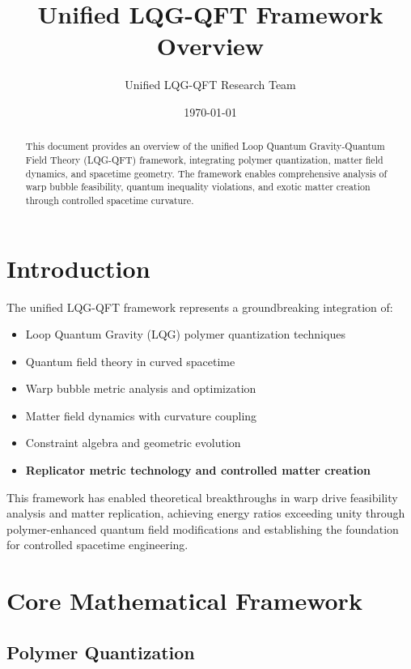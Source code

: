 \documentclass[11pt]{article}
\title{Unified LQG-QFT Framework Overview}
\author{Unified LQG-QFT Research Team}
\date{\today}
\begin{document}
\maketitle

\begin{abstract}
This document provides an overview of the unified Loop Quantum Gravity-Quantum Field Theory (LQG-QFT) framework, integrating polymer quantization, matter field dynamics, and spacetime geometry. The framework enables comprehensive analysis of warp bubble feasibility, quantum inequality violations, and exotic matter creation through controlled spacetime curvature.
\end{abstract}

\tableofcontents
\newpage

\section{Introduction}

The unified LQG-QFT framework represents a groundbreaking integration of:
\begin{itemize}
\item Loop Quantum Gravity (LQG) polymer quantization techniques
\item Quantum field theory in curved spacetime
\item Warp bubble metric analysis and optimization
\item Matter field dynamics with curvature coupling
\item Constraint algebra and geometric evolution
\item \textbf{Replicator metric technology and controlled matter creation}
\end{itemize}

This framework has enabled theoretical breakthroughs in warp drive feasibility analysis and matter replication, achieving energy ratios exceeding unity through polymer-enhanced quantum field modifications and establishing the foundation for controlled spacetime engineering.

\section{Core Mathematical Framework}

\subsection{Polymer Quantization}
\end{document}
